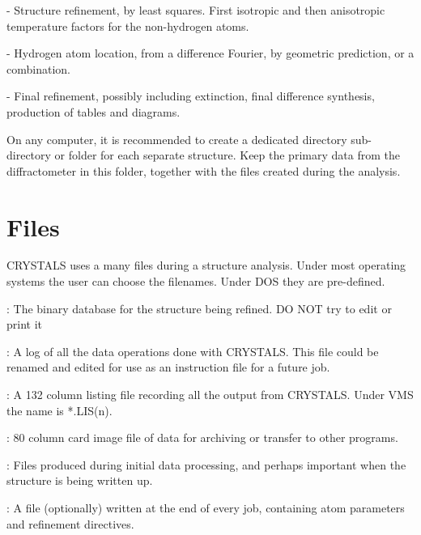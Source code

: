 \documentclass[10pt,a4paper]{report}
\begin{document}
- Structure refinement, by least squares. First isotropic and then
   anisotropic temperature factors for the non-hydrogen atoms.


- Hydrogen atom location, from a difference Fourier, by geometric
   prediction, or a combination.


- Final refinement, possibly including extinction, final difference
   synthesis, production of tables and diagrams.





\bigskip{}




On any computer, it is recommended to create a dedicated directory
 sub-directory or
 folder for each separate structure. Keep the primary data
from the diffractometer in this folder, together with the files created
during the analysis.
\section{Files}


CRYSTALS uses a many files during a structure analysis. Under most
operating systems the user can choose the filenames. Under DOS they are
pre-defined.





\bigskip{}
 : The binary database for the structure being refined. DO NOT try
           to edit or print it


\bigskip{}
: A log of all the data operations done with CRYSTALS. This
file could be renamed and edited for use as an instruction file for a
future job.


\bigskip{}
: A 132 column listing file recording all the output from CRYSTALS. Under
VMS the name is *.LIS(n).


\bigskip{}
: 80 column card image file of data for archiving or transfer to other
programs.


\bigskip{}
: Files produced during initial data processing, and perhaps important
when the structure is being written up.


\bigskip{}
: A file (optionally) written at the end of every job, containing atom
parameters and refinement directives.





\bigskip{}
\end{document}
